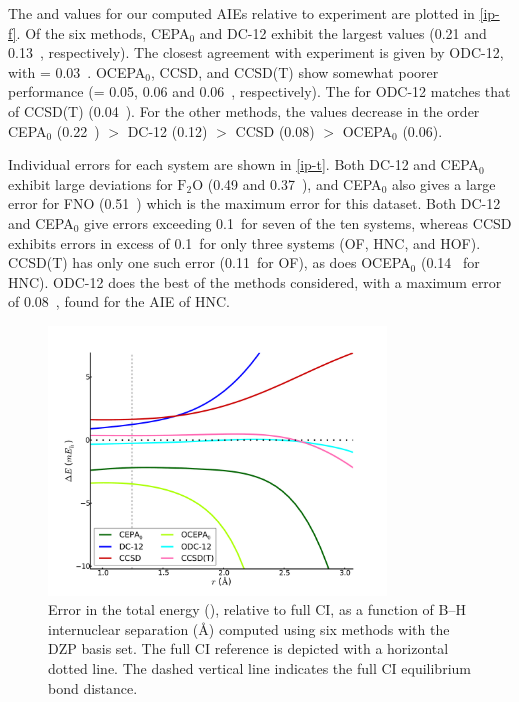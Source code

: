 The \mae and \std values for our computed AIEs relative to experiment are
plotted in \cref{ip-f}.
Of the six methods, CEPA$_0$ and DC-12 exhibit the largest \mae values (0.21 and
0.13~\eV, respectively).
The closest agreement with experiment is given by ODC-12, with \mae = 0.03~\eV.
OCEPA$_0$, CCSD, and CCSD(T) show somewhat poorer performance (\mae = 0.05, 0.06
and 0.06~\eV, respectively). 
The \std for ODC-12 matches that of CCSD(T) (0.04~\eV).
For the other methods, the \std values decrease in the order CEPA$_0$ (0.22~\eV)
$>$ DC-12 (0.12) $>$ CCSD (0.08) $>$ OCEPA$_0$ (0.06).

Individual errors for each system are shown in \cref{ip-t}.
Both DC-12 and CEPA$_0$ exhibit large deviations for $\mathrm{F_2O}$ (0.49 and
0.37~\eV), and CEPA$_0$ also gives a large error for FNO (0.51~\eV) which is the
maximum error for this dataset.
Both DC-12 and CEPA$_0$ give errors exceeding 0.1~\eV for seven of the ten
systems, whereas CCSD exhibits errors in excess of 0.1~\eV for only three
systems (OF, HNC, and HOF).
CCSD(T) has only one such error (0.11~\eV for OF), as does OCEPA$_0$ (0.14~\eV
for HNC).
ODC-12 does the best of the methods considered, with a maximum error of
0.08~\eV, found for the AIE of HNC.


\begin{figure}
	\centering
	\includegraphics[width=0.8\textwidth]{figures/bh.pdf}
	\caption{%
        \label{bh-f}
        Error in the total energy (\mhartree), relative to full CI, as a
        function of B--H internuclear separation (\AA) computed using six
        methods with the DZP basis set.
        The full CI reference is depicted with a horizontal dotted line.
        The dashed vertical line indicates the full CI equilibrium bond
        distance.
	}
\end{figure}


